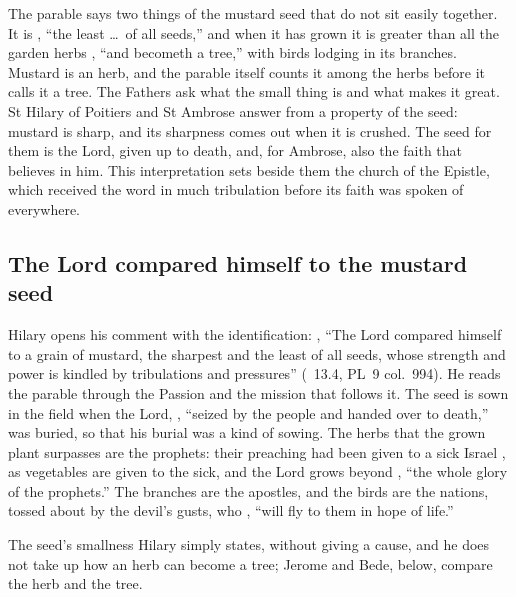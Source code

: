 
The parable says two things of the mustard seed that do not sit easily
together. It is , ``the least \dots\ of
all seeds,'' and when it has grown it is greater than all the garden herbs
, ``and becometh a tree,'' with birds lodging in its
branches. Mustard is an herb, and the parable itself counts it among the
herbs before it calls it a tree. The Fathers ask what the small thing is and
what makes it great. St Hilary of Poitiers and St Ambrose answer from a
property of the seed: mustard is sharp, and its sharpness comes out when it is
crushed. The seed for them is the Lord, given up to death, and, for Ambrose,
also the faith that believes in him. This interpretation sets beside them the
church of the Epistle, which received the word in much tribulation before its
faith was spoken of everywhere.

\subsection{The Lord compared himself to the mustard seed}
\label{sec:seed-hilary}

Hilary opens his comment with the identification: , ``The Lord compared
himself to a grain of mustard, the sharpest and the least of all seeds, whose
strength and power is kindled by tribulations and pressures''
(~13.4, PL~9 col.~994). He reads the parable through the
Passion and the mission that follows it. The seed is sown in the field when the Lord,
, ``seized by the people and
handed over to death,'' was buried, so that his burial was a kind of sowing.
The herbs that the grown plant surpasses are the prophets: their preaching
had been given to a sick Israel , as vegetables are
given to the sick, and the Lord grows beyond , ``the whole glory of the prophets.'' The branches are the apostles,
and the birds are the nations, tossed about by the devil's gusts, who
, ``will fly to them in hope of life.''

The seed's smallness Hilary simply states, without giving a cause, and he
does not take up how an herb can become a tree; Jerome and Bede, below,
compare the herb and the tree.

